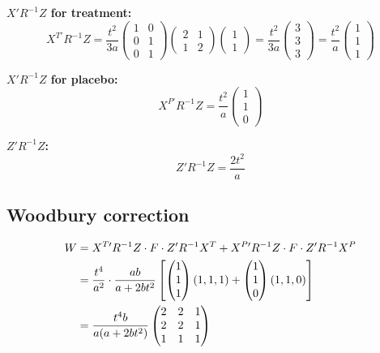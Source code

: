 \documentclass[11pt]{article}
\begin{document}
\textbf{$X'R^{-1}Z$ for treatment:}
\begin{equation}
  X^{T\prime} R^{-1} Z
  = \frac{t^2}{3a}\begin{pmatrix}1&0\\0&1\\0&1\end{pmatrix}
    \begin{pmatrix}2&1\\1&2\end{pmatrix}
    \begin{pmatrix}1\\1\end{pmatrix}
  = \frac{t^2}{3a}\begin{pmatrix}3\\3\\3\end{pmatrix}
  = \frac{t^2}{a}\begin{pmatrix}1\\1\\1\end{pmatrix}
\end{equation}

\textbf{$X'R^{-1}Z$ for placebo:}
\begin{equation}
  X^{P\prime} R^{-1} Z
  = \frac{t^2}{a}\begin{pmatrix}1\\1\\0\end{pmatrix}
\end{equation}

\textbf{$Z'R^{-1}Z$:}
\begin{equation}
  Z'R^{-1}Z = \frac{2t^2}{a}
\end{equation}

\subsection{Woodbury correction}

\begin{align}
  W &= X^{T\prime}R^{-1}Z \cdot F \cdot Z'R^{-1}X^T
    + X^{P\prime}R^{-1}Z \cdot F \cdot Z'R^{-1}X^P
    \notag \\
  &= \frac{t^4}{a^2}\cdot\frac{ab}{a+2bt^2}\left[
    \begin{pmatrix}1\\1\\1\end{pmatrix}(1,1,1)
    + \begin{pmatrix}1\\1\\0\end{pmatrix}(1,1,0)
  \right] \notag \\
  &= \frac{t^4 b}{a(a+2bt^2)}\begin{pmatrix}
    2 & 2 & 1 \\ 2 & 2 & 1 \\ 1 & 1 & 1
  \end{pmatrix}
\end{align}
\end{document}
